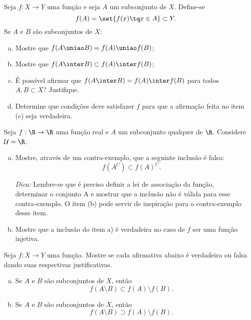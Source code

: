 \begin{exercise}
    Seja $f: X \to Y$ uma função e seja $A$ um subconjunto de $X$.
Define-se $$f(A) = \set{f(x) \tq x\in A} \subset Y.$$ Se $A$ e $B$
são subconjuntos de $X$:
\begin{enumerate}[(a)]
  \item Mostre que $f(A \uniao B) = f(A) \uniao f(B)$;
  \item Mostre que $f(A \inter B) \subset f(A) \inter f(B)$;
  \item É possível afirmar que $f(A \inter B) = f(A) \inter f(B)$ para
  todos $A, B \subset X$? Justifique.
  \item Determine que condições deve satisfazer $f$ para que a
  afirmação feita no item (c) seja verdadeira.
\end{enumerate}

\begin{exercise}
  Seja $f : \R \to \R$ uma função real e $A$ um subconjunto qualquer de $\R$. Considere $\mathcal U = \R$.
       
        \begin{enumerate}[a)]
            \item Mostre, através de um contra-exemplo, que a seguinte inclusão é falsa: $$f\left(A^C\right) \subset f(A)^C.$$
            
            \emph{Dica:} Lembre-se que é preciso definir a lei de associação da função, determinar o conjunto A e mostrar que a inclusão não é válida para esse contra-exemplo. O item (b) pode servir de inspiração para o contra-exemplo desse item.

            \item Mostre que a inclusão do item a) é verdadeira no caso de $f$ ser uma função injetiva.
        \end{enumerate}
\end{exercise}

\end{exercise}

\begin{exercise}
    Seja $f: X \to Y$ uma função. Mostre se cada afirmativa abaixo é verdadeira ou falsa dando suas respectivas justificativas.

    \begin{enumerate}[a)]
        \item Se $A$ e $B$ são subconjuntos de $X$, então $$f \left( A \setminus B \right) \subset f(A) \setminus f(B).$$
        \item  Se $A$ e $B$ são subconjuntos de $X$, então $$f \left( A \setminus B \right) \supset f(A) \setminus f(B).$$
    \end{enumerate}
\end{exercise}

